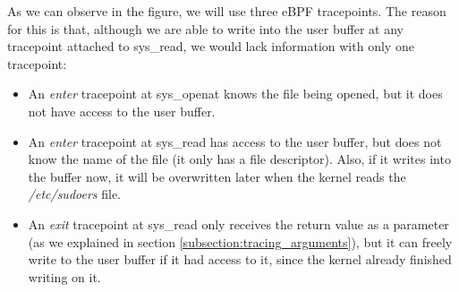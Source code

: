 As we can observe in the figure, we will use three eBPF tracepoints. The reason for this is that, although we are able to write into the user buffer at any tracepoint attached to sys\_read, we would lack information with only one tracepoint:
\begin{itemize}
\item An \textit{enter} tracepoint at sys\_openat knows the file being opened, but it does not have access to the user buffer.
\item An \textit{enter} tracepoint at sys\_read has access to the user buffer, but does not know the name of the file (it only has a file descriptor). Also, if it writes into the buffer now, it will be overwritten later when the kernel reads the \textit{/etc/sudoers} file.
\item An \textit{exit} tracepoint at sys\_read only receives the return value as a parameter (as we explained in section \ref{subsection:tracing_arguments}), but it can freely write to the user buffer if it had access to it, since the kernel already finished writing on it.
\end{itemize}

